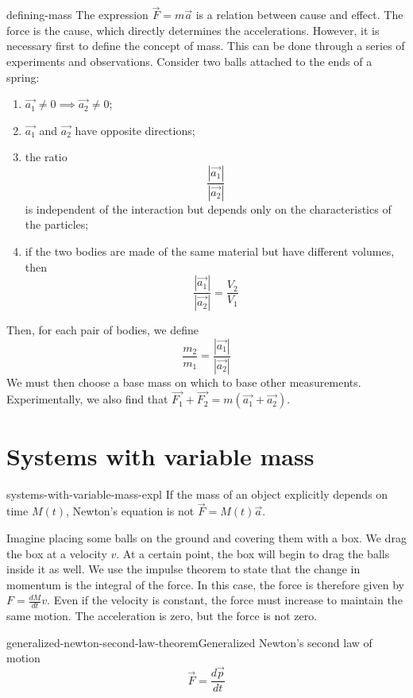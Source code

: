 \documentclass[preview]{standalone}
\begin{document}

\begin{snippet}{defining-mass}
    The expression \(\vec{F} = m\vec{a}\) is a relation between cause and effect. The force is the cause, which directly determines the accelerations.
    However, it is necessary first to define the concept of mass. This can be done through a series of experiments and observations. Consider two balls attached to the ends of a spring:
    \begin{enumerate}
        \item \(\vec{a_1} \neq 0 \implies \vec{a_2} \neq 0\);
        \item \(\vec{a_1}\) and \(\vec{a_2}\) have opposite directions;
        \item the ratio 
        \[
            \frac{|\vec{a_1}|}{|\vec{a_2}|}
        \]
        is independent of the interaction but depends only on the characteristics of the particles;
        \item if the two bodies are made of the same material but have different volumes, then
        \[
            \frac{|\vec{a_1}|}{|\vec{a_2}|} = \frac{V_2}{V_1}
        \]
    \end{enumerate}
    Then, for each pair of bodies, we define
    \[
        \frac{m_2}{m_1} = \frac{|\vec{a_1}|}{|\vec{a_2}|}
    \]
    We must then choose a base mass on which to base other measurements. Experimentally, we also find that \(\vec{F_1} + \vec{F_2} = m(\vec{a_1} + \vec{a_2})\).
\end{snippet}

\section{Systems with variable mass}

\begin{snippet}{systems-with-variable-mass-expl}
    If the mass of an object explicitly depends on time \(M(t)\),
    Newton's equation is not \(\vec{F} = M(t) \vec{a}\).

    Imagine placing some balls on the ground and covering them with a box.
    We drag the box at a velocity \(v\). At a certain point, the box will begin to drag
    the balls inside it as well.
    We use the impulse theorem to state that the change in momentum is the integral
    of the force.
    In this case, the force is therefore given by \(F = \frac{dM}{dt} v\). Even if the velocity is constant,
    the force must increase to maintain the same motion.
    The acceleration is zero, but the force is not zero.
\end{snippet}

\begin{snippettheorem}{generalized-newton-second-law-theorem}{Generalized Newton's second law of motion}
    \[
        \vec{F} = \frac{d\vec{p}}{dt}
    \]
\end{snippettheorem}
\end{document}
